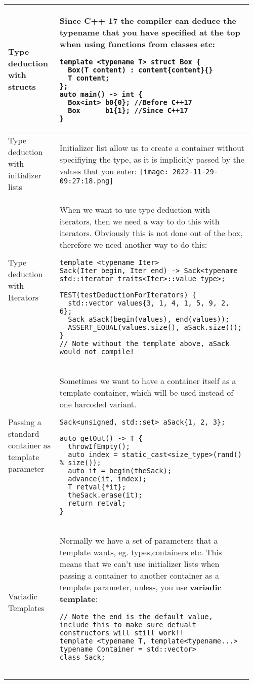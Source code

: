 \documentclass[main.tex,fontsize=8pt,paper=a4,paper=portrait,DIV=calc,]{scrartcl}
\begin{document}
\begin{table}[ht!]
\begin{tabular}{|m{0.2\linewidth}|m{0.755\linewidth}|}
\hline
Type deduction with structs & 
Since C++ 17 the compiler can deduce the typename that you have specified at the top when using functions from classes etc: \newline
\begin{lstlisting}
template <typename T> struct Box {
  Box(T content) : content{content}{}
  T content;
};
auto main() -> int {
  Box<int> b0{0}; //Before C++17
  Box      b1{1}; //Since C++17
}
\end{lstlisting} \\
\hline
Type deduction with initializer lists & 
Initializer list allow us to create a container without specifiying the type, as it is implicitly passed by the values that you enter:\newline
\texttt{[image: 2022-11-29-09:27:18.png]}\\
\hline
Type deduction with Iterators & 
When we want to use type deduction with iterators, then we need a way to do this with iterators.\newline
Obviously this is not done out of the box, therefore we need another way to do this: \newline
\begin{lstlisting}
template <typename Iter>
Sack(Iter begin, Iter end) -> Sack<typename std::iterator_traits<Iter>::value_type>;

TEST(testDeductionForIterators) {
  std::vector values{3, 1, 4, 1, 5, 9, 2, 6};
  Sack aSack(begin(values), end(values));
  ASSERT_EQUAL(values.size(), aSack.size());
}
// Note without the template above, aSack would not compile!
\end{lstlisting}\\
\hline
Passing a standard container as template parameter & 
Sometimes we want to have a container itself as a template container, which will be used instead of one harcoded variant.\newline
\begin{lstlisting}
Sack<unsigned, std::set> aSack{1, 2, 3};

auto getOut() -> T {
  throwIfEmpty();
  auto index = static_cast<size_type>(rand() % size());
  auto it = begin(theSack);
  advance(it, index);
  T retval{*it};
  theSack.erase(it);
  return retval;
}
\end{lstlisting}\\
\hline
Variadic Templates & 
Normally we have a set of parameters that a template wants, eg. types,containers etc. This means that we can't use initializer lists when passing a container to another container as a template parameter, unless, you use \textbf{variadic template}:\newline
\begin{lstlisting}
// Note the end is the default value, include this to make sure defualt constructors will still work!!
template <typename T, template<typename...> typename Container = std::vector>
class Sack;


\end{lstlisting}
\end{tabular}
\end{table}
\end{document}
